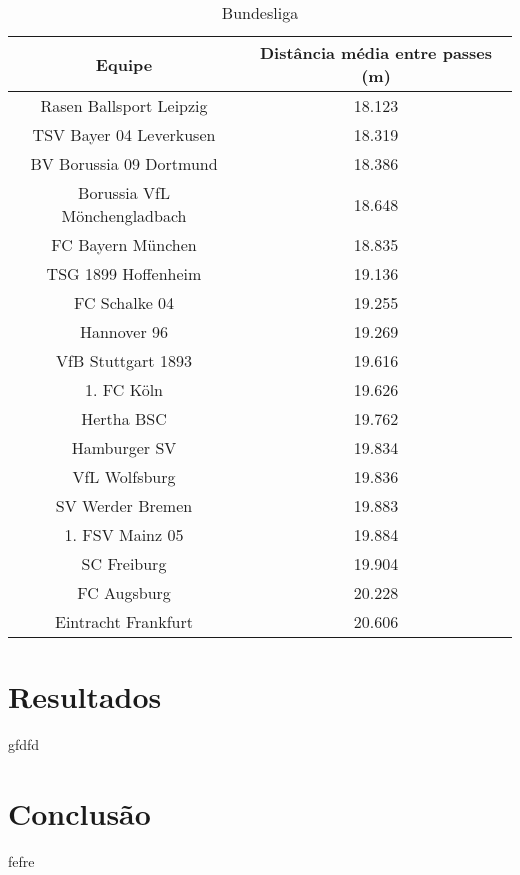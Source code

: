 \documentclass{article}
\begin{document}

\begin{table}[H]
    \centering
    \begin{tabular}{|c|c|}
        \hline
        \textbf{Equipe}              & \textbf{Distância média entre passes (m)} \\ \hline
        Rasen Ballsport Leipzig      & 18.123                                    \\ \hline
        TSV Bayer 04 Leverkusen      & 18.319                                    \\ \hline
        BV Borussia 09 Dortmund      & 18.386                                    \\ \hline
        Borussia VfL Mönchengladbach & 18.648                                    \\ \hline
        FC Bayern München            & 18.835                                    \\ \hline
        TSG 1899 Hoffenheim          & 19.136                                    \\ \hline
        FC Schalke 04                & 19.255                                    \\ \hline
        Hannover 96                  & 19.269                                    \\ \hline
        VfB Stuttgart 1893           & 19.616                                    \\ \hline
        1. FC Köln                   & 19.626                                    \\ \hline
        Hertha BSC                   & 19.762                                    \\ \hline
        Hamburger SV                 & 19.834                                    \\ \hline
        VfL Wolfsburg                & 19.836                                    \\ \hline
        SV Werder Bremen             & 19.883                                    \\ \hline
        1. FSV Mainz 05              & 19.884                                    \\ \hline
        SC Freiburg                  & 19.904                                    \\ \hline
        FC Augsburg                  & 20.228                                    \\ \hline
        Eintracht Frankfurt          & 20.606                                    \\ \hline
    \end{tabular}
    \caption{Bundesliga}
    \label{tab:average_distance_germany}
\end{table}

\section{Resultados}

gfdfd

\section{Conclusão}

fefre

\newpage

\renewcommand{\refname}{Referências Bibliográficas}

\nocite{*}
\end{document}
